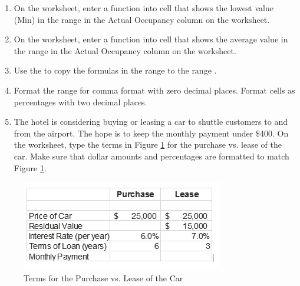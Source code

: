 \begin{enumerate}
	\item On the  worksheet, enter a function into cell  that shows the lowest value (Min) in the range  in the Actual Occupancy column on the  worksheet.
	
	\item On the  worksheet, enter a function into cell  that shows the average value in the range  in the Actual Occupancy column on the  worksheet.
	
	\item Use the  to copy the formulas in the range  to the range .
	
	\item Format the range  for comma format with zero decimal places. Format cells  as percentages with two decimal places.
	
	\item The hotel is considering buying or leasing a car to shuttle customers to and from the airport. The hope is to keep the monthly payment under $ \$400 $. On the  worksheet, type the terms in Figure \ref{02:fig50} for the purchase vs. lease of the car. Make sure that dollar amounts and percentages are formatted to match Figure \ref{02:fig50}.
	\end{enumerate}

\begin{figure}[H]
	\centering
	\includegraphics[width=\maxwidth{.95\linewidth}]{gfx/ch02_fig50}
	\caption{Terms for the Purchase vs. Lease of the Car}
	\label{02:fig50}
\end{figure}

